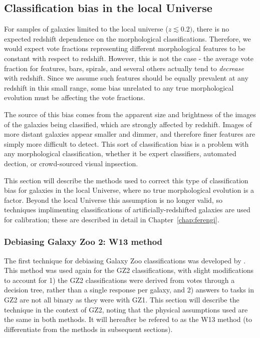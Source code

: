  
\subsection{Classification bias in the local Universe}

For samples of galaxies limited to the local universe ($z\lesssim0.2)$, there is no expected redshift dependence on the morphological classifications. Therefore, we would expect vote fractions representing different morphological features to be constant with respect to redshift. However, this is not the case - the average vote fraction for features, bars, spirals, and several others actually tend to \emph{decrease} with redshift. Since we assume such features should be equally prevalent at any redshift in this small range, some bias unrelated to any true morphological evolution must be affecting the vote fractions. 

The source of this bias comes from the apparent size and brightness of the images of the galaxies being classified, which are strongly affected by redshift. Images of more distant galaxies appear smaller and dimmer, and therefore finer features are simply more difficult to detect. This sort of classification bias is a problem with any morphological classification, whether it be expert classifiers, automated dection, or crowd-sourced visual inpsection.

This section will describe the methods used to correct this type of classification bias for galaxies in the local Universe, where no true morphological evolution is a factor. Beyond the local Universe this assumption is no longer valid, so techniques implimenting classifications of artificially-redshifted galaxies are used for calibration; these are described in detail in Chapter~\ref{chap:ferengi}. 

\subsubsection{Debiasing Galaxy Zoo 2: W13 method}

The first technique for debiasing Galaxy Zoo classifications was developed by \citet{Bamford2009}. This method was used again for the GZ2 classifications, with slight modifications to account for 1) the GZ2 classifications were derived from votes through a decision tree, rather than a single response per galaxy, and 2) answers to tasks in GZ2 are not all binary as they were with GZ1. This section will describe the technique in the context of GZ2, noting that the physical assumptions used are the same in both methods. It will hereafter be refered to as the W13 method (to differentiate from the methods in subsequent sections).   

